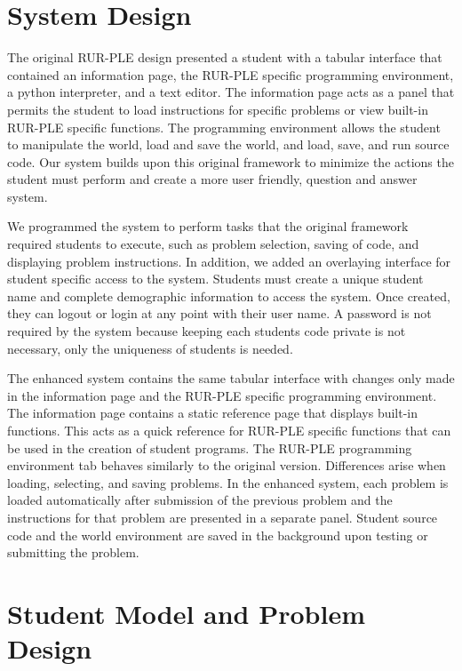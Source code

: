 \documentclass[twocolumn]{article}
\begin{document}
\section{System Design}
\label{sec:system-design}

The original RUR-PLE design presented a student with a tabular interface that contained an information page, the RUR-PLE specific programming environment, a python interpreter, and a text editor. The information page acts as a panel that permits the student to load instructions for specific problems or view built-in RUR-PLE specific functions. The programming environment allows the student to manipulate the world, load and save the world, and load, save, and run source code. Our system builds upon this original framework to minimize the actions the student must perform and create a more user friendly, question and answer system.

We programmed the system to perform tasks that the original framework required students to execute, such as problem selection, saving of code, and displaying problem instructions. In addition, we added an overlaying interface for student specific access to the system. Students must create a unique student name and complete demographic information to access the system. Once created, they can logout or login at any point with their user name. A password is not required by the system because keeping each students code private is not necessary, only the uniqueness of students is needed.

The enhanced system contains the same tabular interface with changes only made in the information page and the RUR-PLE specific programming environment. The information page contains a static reference page that displays built-in functions. This acts as a quick reference for RUR-PLE specific functions that can be used in the creation of student programs. The RUR-PLE programming environment tab behaves similarly to the original version. Differences arise when loading, selecting, and saving problems. In the enhanced system, each problem is loaded automatically after submission of the previous problem and the instructions for that problem are presented in a separate panel. Student source code and the world environment are saved in the background upon testing or submitting the problem. 



\section{Student Model and Problem Design}
\label{sec:prob-selection}
\end{document}
